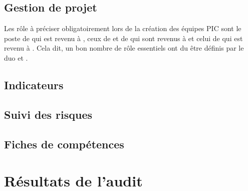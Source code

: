 \documentclass[asi]{picInsa}
\begin{document}
\section{Gestion de projet}
Les rôle à préciser obligatoirement lors de la création des équipes PIC sont le poste de \CP{} qui est revenu à \Sergi{}, ceux de \CPA{} et de \RQ{} qui sont revenus à \Pierre{} et celui de \RQA{} qui est revenu à \Kafui{}. Cela dit, un bon nombre de rôle essentiels ont du être définis par le duo \CP{} et \RQ{}. 

\section{Indicateurs}


\section{Suivi des risques}


\section{Fiches de compétences}



\chapter{Résultats de l'audit}
\label{Resultats}

 
\begin{appendix}
\listoffigures
{}
	 
\listoftables
{}
\end{appendix}
\pageQuatriemeCouverture
\end{document}
